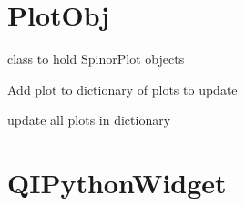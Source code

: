 \documentclass[letterpaper,10pt,english]{sphinxmanual}
\begin{document}
\section{PlotObj}
\label{PlotObj:plotobj}\label{PlotObj::doc}

\begin{fulllineitems}
\label{PlotObj:Ipython.PlotObj}
class to hold  SpinorPlot objects

\begin{fulllineitems}
\label{PlotObj:Ipython.PlotObj.add_plot}
Add plot to dictionary of plots to update

\end{fulllineitems}


\begin{fulllineitems}
\label{PlotObj:Ipython.PlotObj.update}
update all plots in dictionary

\end{fulllineitems}


\end{fulllineitems}



\section{QIPythonWidget}
\label{QIPythonWidget:qipythonwidget}\label{QIPythonWidget::doc}
\end{document}
